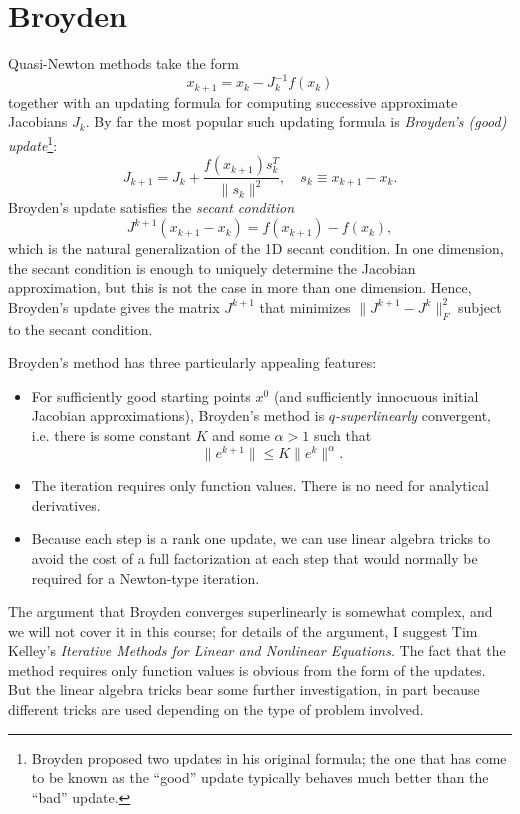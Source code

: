 \documentclass[12pt, leqno]{article} %
\begin{document}
\section{Broyden}

Quasi-Newton methods take the form
\[
  x_{k+1} = x_k - J_k^{-1} f(x_k)
\]
together with an updating formula for computing successive approximate
Jacobians $J_k$.  By far the most popular such updating formula is
{\em Broyden's (good) update}\footnote{Broyden proposed two updates in
  his original formula; the one that has come to be known as the
  ``good'' update typically behaves much better than the ``bad''
  update.}:
\[
  J_{k+1} = J_k + \frac{f(x_{k+1}) s_k^T}{\|s_k\|^2}, \quad s_k \equiv x_{k+1}-x_k.
\]
Broyden's update satisfies the {\em secant condition}
\[
  J^{k+1} (x_{k+1}-x_k) = f(x_{k+1})-f(x_k),
\]
which is the natural generalization of the 1D secant condition.
In one dimension, the secant condition is enough to
uniquely determine the Jacobian approximation, but this is not the
case in more than one dimension.  Hence, Broyden's update gives the
matrix $J^{k+1}$ that minimizes $\|J^{k+1}-J^k\|_F^2$ subject to the
secant condition.

Broyden's method has three particularly appealing features:
\begin{itemize}
\item
  For sufficiently good starting points $x^0$ (and sufficiently
  innocuous initial Jacobian approximations), Broyden's method is
  {\em $q$-superlinearly} convergent, i.e. there is some constant
  $K$ and some $\alpha > 1$ such that
  \[
    \|e^{k+1}\| \leq K \|e^k\|^\alpha.
  \]
\item
  The iteration requires only function values.  There is no need
  for analytical derivatives.
\item
  Because each step is a rank one update, we can use linear algebra
  tricks to avoid the cost of a full factorization at each step that
  would normally be required for a Newton-type iteration.
\end{itemize}

The argument that Broyden converges superlinearly is somewhat complex,
and we will not cover it in this course; for details of the argument,
I suggest
Tim Kelley's {\em Iterative Methods for Linear and Nonlinear Equations}.
The fact that the method requires only function values is obvious from
the form of the updates.  But the linear algebra tricks bear some
further investigation, in part because different tricks are used
depending on the type of problem involved.
\end{document}

